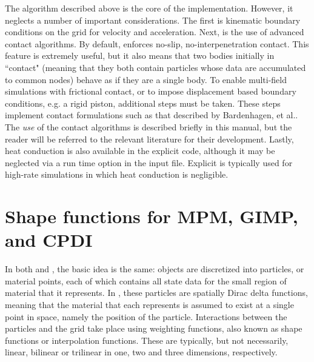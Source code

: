 The algorithm described above is the core of the \Vaango \MPM implementation.
However, it neglects a number of important considerations.  The first is
kinematic boundary conditions on the grid for velocity and acceleration.
Next, is the use of advanced contact
algorithms.  By default, \MPM enforces no-slip, no-interpenetration contact.
This feature is extremely useful, but it also means that two bodies initially
in ``contact" (meaning that they both contain particles whose data are
accumulated to common nodes) behave as if they are a single body.  To enable
multi-field simulations with frictional contact, or to impose displacement
based boundary conditions, e.g. a rigid piston, additional steps must be
taken.  These steps implement contact formulations such as that described
by Bardenhagen, et al.\cite{Bard2001}.  The {\it use} of the contact
algorithms is described briefly in this manual, but the reader will be
referred to the relevant literature for their development.  Lastly, heat
conduction is also available in the explicit \MPM code, although it may be
neglected via a run time option in the input file.  Explicit \MPM is typically
used for high-rate simulations in which heat conduction is negligible.

\section{Shape functions for MPM, GIMP, and CPDI} \label{gimp_mpm}
In both \MPM and \GIMP, the basic idea is the same: objects are discretized into
particles, or material points, each of which contains all state data for the
small region of material that it represents.  In \MPM, these particles are spatially
Dirac delta functions, meaning that the material that each represents is
assumed to exist at a single point in space, namely the position of the
particle.  Interactions between the particles and the grid take place
using weighting functions, also known as shape functions or interpolation
functions.  These are typically, but not necessarily, linear, bilinear or
trilinear in one, two and three dimensions, respectively.

